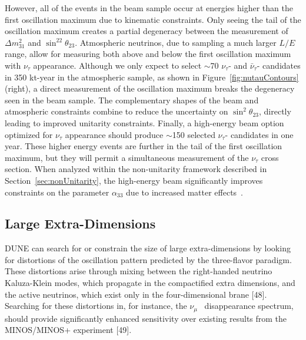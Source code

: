 However, all of the events in the beam sample occur at energies higher than the first oscillation maximum due to kinematic constraints.  Only seeing the tail of the oscillation maximum creates a partial degeneracy between the measurement of $\Delta m^2_{31}$ and $\sin^22\theta_{23}$.  Atmospheric neutrinos, due to sampling a much larger $L/E$ range, allow for measuring both above and below the first oscillation maximum with $\nu_{\tau}$ appearance.  Although we only expect to select $\sim$70 $\nu_{\tau}$- and $\bar{\nu}_{\tau}$- candidates in 350 kt-year in the atmospheric sample, as shown in Figure~\ref{fig:nutauContours} (right), a direct measurement of the oscillation maximum breaks the degeneracy seen in the beam sample. The complementary shapes of the beam and atmospheric constraints combine to reduce the uncertainty on $\sin^2\theta_{23}$, directly leading to improved unitarity constraints.  Finally, a high-energy beam option optimized for $\nu_{\tau}$ appearance should produce $\sim$150 selected  $\nu_{\tau}$- candidates in one year.  These higher energy events are further in the tail of the first oscillation maximum, but they will permit a simultaneous measurement of the $\nu_{\tau}$ cross section.  When analyzed within the non-unitarity framework described in Section~\ref{sec:nonUnitarity}, the high-energy beam significantly improves constraints on the parameter $\alpha_{33}$ due to increased matter effects~\cite{deGouvea:2019ozk}.

\subsection{Large Extra-Dimensions}
DUNE can search for or constrain the size of large extra-dimensions %
by looking for distortions of the oscillation pattern predicted by the three-flavor paradigm. These distortions arise through mixing between the right-handed neutrino Kaluza-Klein modes, which propagate in the compactified extra dimensions, and the active neutrinos, which exist only in the four-dimensional brane [48]. Searching for these distortions in, for instance, the $\nu_\mu$~ disappearance spectrum, should provide significantly enhanced sensitivity over existing results from the MINOS/MINOS+ experiment [49].

